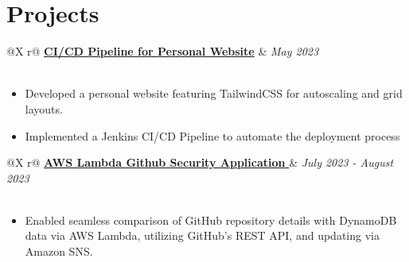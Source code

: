 \documentclass[a4paper,12pt]{article}
\begin{document}
\section{Projects}

\begin{tabularx}{\linewidth}{ @{}X r@{} }
    \href{https://ishan-next-react-website.vercel.app/}{\textbf{CI/CD Pipeline for Personal Website}} & \textit{May 2023} \\
     \\
\end{tabularx} 


\begin{minipage}{\linewidth}
    \begin{itemize}[nosep,after=\strut, leftmargin=1em]
    \item Developed a personal website featuring TailwindCSS for autoscaling and grid layouts. 

    \item Implemented a Jenkins CI/CD Pipeline to automate the deployment process
    \end{itemize}
\end{minipage}




    

\begin{tabularx}{\linewidth}{ @{}X r@{} }
    \href{https://github.com/IshanPhadte776/LambdaEventTriggering}{\textbf{AWS Lambda Github Security Application }} & \textit{July 2023 - August 2023} \\
     \\
\end{tabularx}





\begin{minipage}{\linewidth}
\begin{itemize}[nosep,after=\strut, leftmargin=1em]
        \item Enabled seamless comparison of GitHub repository details with DynamoDB data via AWS Lambda, utilizing GitHub's REST API, and updating via Amazon SNS.
    \end{itemize}
\end{minipage}
\end{document}
